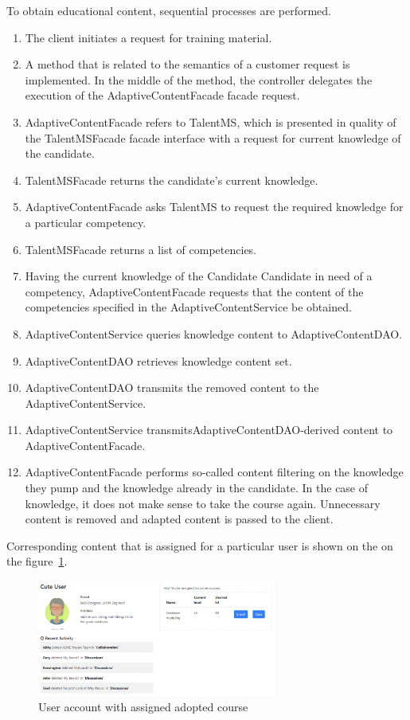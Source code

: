 \documentclass[a4paper,14pt,oneside,final]{extarticle}
\begin{document}
To obtain educational content, sequential processes are performed. 
\begin{enumerate}
    \item The client initiates a request for training material.
    \item A method that is related to the semantics of a customer request is implemented. In the middle of the method, the controller delegates the execution of the AdaptiveContentFacade facade request.
    \item AdaptiveContentFacade refers to TalentMS, which is presented in
    quality of the TalentMSFacade facade interface with a request for current knowledge of the candidate.
    \item TalentMSFacade returns the candidate's current knowledge.
    \item AdaptiveContentFacade asks TalentMS to request the required knowledge for a particular competency.
    \item TalentMSFacade returns a list of competencies.
    \item Having the current knowledge of the Candidate Candidate in need of a competency, AdaptiveContentFacade requests that the content of the competencies specified in the AdaptiveContentService be obtained.
    \item AdaptiveContentService queries knowledge content to AdaptiveContentDAO.
    \item AdaptiveContentDAO retrieves knowledge content set.
    \item AdaptiveContentDAO transmits the removed content to the AdaptiveContentService.
    \item AdaptiveContentService transmitsAdaptiveContentDAO-derived content to AdaptiveContentFacade.
    \item AdaptiveContentFacade performs so-called content filtering on the knowledge they pump and the knowledge already in the candidate. In the case of knowledge, it does not make sense to take the course again. Unnecessary content is removed and adapted content is passed to the client. 
\end{enumerate}

Corresponding content that is assigned for a particular user is shown on the on the figure~\ref{fig:8}. 

\begin{figure}[H]
    \centering
    \includegraphics[width=0.7\textwidth]{fig8}
    \caption{User account with assigned adopted course}
    \label{fig:8}
\end{figure}
\end{document}
